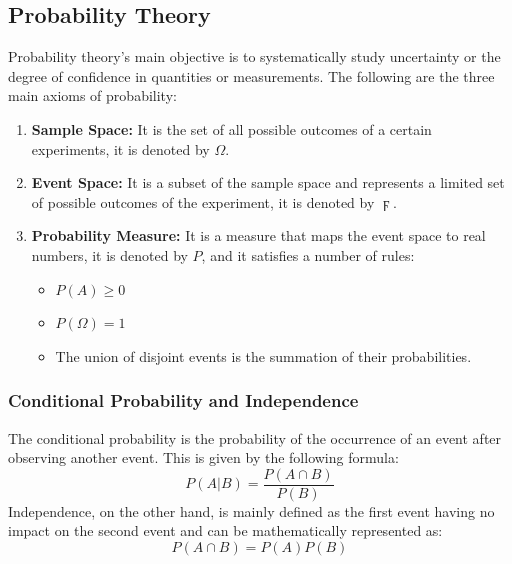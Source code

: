 \documentclass{article}
\begin{document}
\subsection{Probability Theory}
Probability theory's main objective is to systematically study uncertainty or the degree of confidence in quantities or measurements. The following are the three main axioms of probability:
\begin{enumerate}
 \item \textbf{Sample Space:} It is the set of all possible outcomes of a certain experiments, it is denoted by $\Omega$.
 \item \textbf{Event Space:} It is a subset of the sample space and represents a limited set of possible outcomes of the experiment, it is denoted by $\digamma$.
 \item \textbf{Probability Measure:} It is a measure that maps the event space to real numbers, it is denoted by $P$, and it satisfies a number of rules:
 	\begin{itemize}
 	\item $P(A) \geq 0 $
 	\item $P(\Omega) = 1$
 	\item The union of disjoint events is the summation of their probabilities.
 	\end{itemize}
\end{enumerate} 

\subsubsection{Conditional Probability and Independence}
The conditional probability is the probability of the occurrence of an event after observing another event. This is given by the following formula:
\begin{equation}
P(A|B) = \frac{P(A \cap B)}{P(B)}
\end{equation}
Independence, on the other hand, is mainly defined as the first event having no impact on the second event and can be mathematically represented as:
\begin{equation}
P(A \cap B) = P(A)P(B)
\end{equation}
\end{document}
